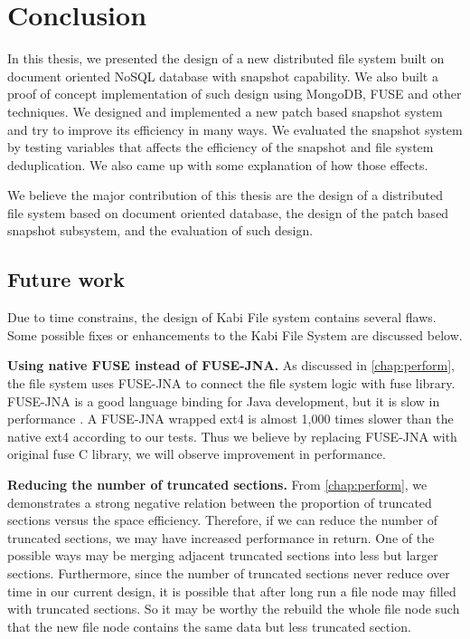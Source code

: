 \chapter{Conclusion}
\label{chap:conclusion}

    In this thesis, we presented the design of a new distributed file system built on document oriented NoSQL database with snapshot capability. We also built a proof of concept implementation of such design using MongoDB, FUSE and other techniques. We designed and implemented a new patch based snapshot system and try to improve its efficiency in many ways. We evaluated the snapshot system by testing variables that affects the efficiency of the snapshot and file system deduplication. We also came up with some explanation of how those effects.

    We believe the major contribution of this thesis are the design of a distributed file system based on document oriented database, the design of the patch based snapshot subsystem, and the evaluation of such design.

\section{Future work}

    Due to time constrains, the design of Kabi File system contains several flaws. Some possible fixes or enhancements to the Kabi File System are discussed below.
    
    \textbf{Using native FUSE instead of FUSE-JNA.} As discussed in \cref{chap:perform}, the file system uses FUSE-JNA to connect the file system logic with fuse library. FUSE-JNA is a good language binding for Java development, but it is slow in performance \cite{fusejna}. A FUSE-JNA wrapped ext4 is almost 1,000 times slower than the native ext4 according to our tests. Thus we believe by replacing FUSE-JNA with original fuse C library, we will observe improvement in performance.

    \textbf{Reducing the number of truncated sections.} From \cref{chap:perform}, we demonstrates a strong negative relation between the proportion of truncated sections versus the space efficiency. Therefore, if we can reduce the number of truncated sections, we may have increased performance in return. One of the possible ways may be merging adjacent truncated sections into less but larger sections. Furthermore, since the number of truncated sections never reduce over time in our current design, it is possible that after long run a file node may filled with truncated sections. So it may be worthy the rebuild the whole file node such that the new file node contains the same data but less truncated section.
    
